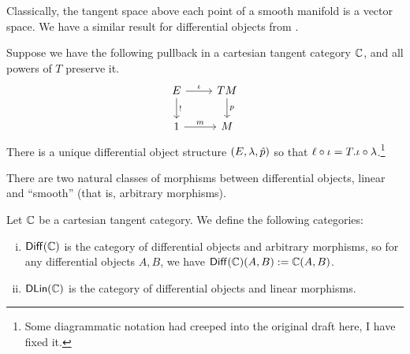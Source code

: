 Classically, the tangent space above each point of a smooth manifold is a vector space. 
We have a similar result for differential objects from \cite{Cockett2018}.
\begin{lemma}\label{lem:tang-space-diff-ob}
    Suppose we have the following pullback in a cartesian tangent category $\mathbb{C}$, and all powers of $T$ preserve it.
    \[
        \begin{tikzcd}
            E \rar{\iota} \dar{!} & TM \dar{p} \\
            1 \rar{m} & M
        \end{tikzcd}
    \]
    There is a unique differential object structure $(E,\lambda,\hat{p})$ so that $\ell \circ \iota = T.\iota\circ \lambda$.\footnote{Some diagrammatic notation had creeped into the original draft here, I have fixed it.}
\end{lemma}

There are two natural classes of morphisms between differential objects, linear and ``smooth'' (that is, arbitrary morphisms).
\begin{definition}\label{def:diff-dlin}
    Let $\mathbb{C}$ be a cartesian tangent category. 
    We define the following categories:
    \begin{enumerate}[(i)]
        \item $\mathsf{Diff}(\mathbb{C})$ is the category of differential objects and arbitrary morphisms, so for any differential objects $A,B$, we have $\mathsf{Diff}(\mathbb{C})(A,B) := \mathbb{C}(A,B)$.
        \item $\mathsf{DLin}(\mathbb{C})$ is the category of differential objects and linear morphisms.
    \end{enumerate}
\end{definition}

